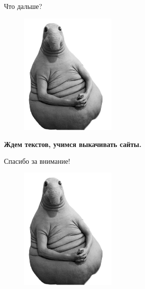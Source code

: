 \documentclass{beamer}
\begin{document}
\begin{frame}{Что дальше?}
\begin{figure}
\includegraphics[height=6cm]{zhdun.jpg}
\end{figure}
\textbf{Ждем текстов, учимся выкачивать сайты.}
	

\end{frame}

\begin{frame}{Спасибо за внимание!}
\begin{figure}
\includegraphics[height=6cm]{zhdun.jpg}
\end{figure}
\end{frame}



	



\end{document}
